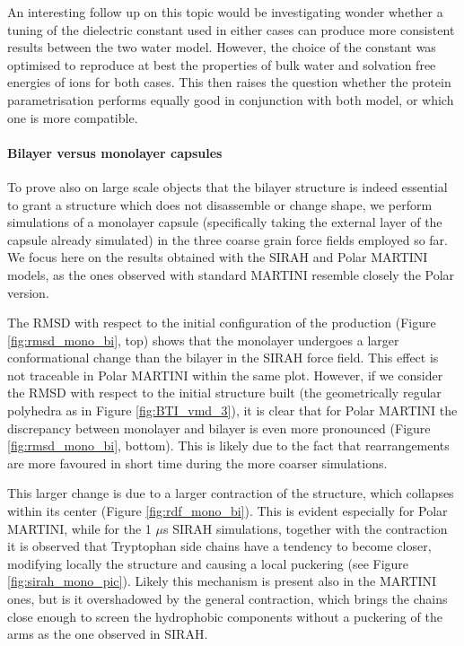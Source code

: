 An interesting follow up on this topic would be investigating wonder whether a tuning of the dielectric constant used in either cases can produce more consistent results between the two water model. However, the choice of the constant was optimised to reproduce at best the properties of bulk water and solvation free energies of ions for both cases. This then raises the question whether the protein parametrisation performs equally good in conjunction with both model, or which one is more compatible.



\paragraph{Bilayer versus monolayer capsules}
To prove also on large scale objects that the bilayer structure is indeed essential to grant a structure which does not disassemble or change shape, we perform simulations of a monolayer capsule (specifically taking the external layer of the capsule already simulated) in the three coarse grain force fields employed so far.
%
We focus here on the results obtained with the SIRAH and Polar MARTINI models, as the ones observed with standard MARTINI resemble closely the Polar version.

The RMSD with respect to the initial configuration of the production (Figure \ref{fig:rmsd_mono_bi}, top) shows that the monolayer undergoes a larger conformational change than the bilayer in the SIRAH force field. This effect is not traceable in Polar MARTINI within the same plot. However, if we consider the RMSD with respect to the initial structure built (the geometrically regular polyhedra as in Figure \ref{fig:BTI_vmd_3}), it is clear that for Polar MARTINI the discrepancy between monolayer and bilayer is even more pronounced (Figure \ref{fig:rmsd_mono_bi}, bottom). This is likely due to the fact that rearrangements are more favoured in short time during the more coarser simulations.

This larger change is due to a larger contraction of the structure, which collapses within its center (Figure \ref{fig:rdf_mono_bi}).
%
This is evident especially for Polar MARTINI, while for the 1 $\mu$s SIRAH simulations, together with the contraction it is observed that Tryptophan side chains have a tendency to become closer, modifying locally the structure and causing a local puckering (see Figure \ref{fig:sirah_mono_pic}). Likely this mechanism is present also in the MARTINI ones, but is it overshadowed by the general contraction, which brings the chains close enough to screen the hydrophobic components without a puckering of the arms as the one observed in SIRAH.

